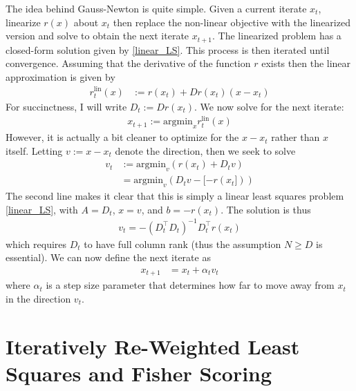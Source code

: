 \documentclass[12pt]{article}
\begin{document}
The idea behind Gauss-Newton is quite simple. Given a current iterate $x_t$, linearize $r(x)$ about $x_t$ then replace the non-linear objective with the linearized version and solve to obtain the 
next iterate $x_{t+1}$. The linearized problem has a closed-form solution given by \ref{linear_LS}. This process is then iterated until convergence. Assuming that the derivative of the function $r$ 
exists then the linear approximation is given by 
\begin{align}
r_t^{\text{lin}}(x) &:= r(x_t) + Dr(x_t)\left(x - x_t \right) 
\end{align}
For succinctness, I will write $D_t := Dr(x_t)$. We now solve for the next iterate:
\begin{align*}
x_{t + 1} := \text{argmin}_x r_t^{\text{lin}}(x)
\end{align*}
However, it is actually a bit cleaner to optimize for the  $x - x_t$ rather than $x$ itself. Letting $v := x - x_t$ denote the direction, then we seek to solve
\begin{align*}
v_t &:= \text{argmin}_v \left(r(x_t) + D_t v \right) \\
	      &= \text{argmin}_v \left(D_t v - [-r(x_t]) \right)
\end{align*}
The second line makes it clear that this is simply a linear least squares problem \ref{linear_LS}, with $A = D_t$, $x = v$, and $b = -r(x_t)$. The solution is thus 
\begin{align*}
v_t = -\left(D_t^\top D_t \right)^{-1} D_t^\top r(x_t)
\end{align*}
which requires $D_t$ to have full column rank (thus the assumption $N \geq D$ is essential). We can now define the next iterate as 
\begin{align*}
x_{t + 1} &= x_t + \alpha_t v_t
\end{align*}
where $\alpha_t$ is a step size parameter that determines how far to move away from $x_t$ in the direction $v_t$. 


\section{Iteratively Re-Weighted Least Squares and Fisher Scoring}
\end{document}
